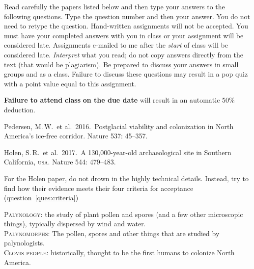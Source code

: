 \documentclass[11pt, hidelinks, addpoints]{exam}
\begin{document}
Read carefully the papers listed below and then type your answers to the following questions.
Type the question number and then your answer. You do not need to retype the question. Hand-written
assignments will not be accepted. You must have your completed answers
with you in class or your assignment will be considered late. Assignments e-mailed to me after the \emph{start} of class will be
considered late. \emph{Interpret} what you read; do not copy answers directly from the text (that would
be plagiarism). Be prepared to discuss your answers in small groups and as a class. Failure
to discuss these questions may result in a pop quiz with a point value
equal to this assignment.

\textbf{Failure to attend} \textbf{class} \textbf{on the due date} will
result in an automatic 50\% deduction.

\begin{hangparas}{1.5em}{1}
Pedersen, M.\,W.~et al.~2016.~Postglacial viability and colonization in North America's ice-free corridor. Nature 537: 45–357.

Holen, S.\,R.~et al.~2017.~A 130,000-year-old archaeological site in Southern California, \textsc{usa}. Nature 544: 479–483. 
\end{hangparas}

For the Holen paper, do not drown in the highly technical details. Instead, try to find how their evidence meets their four criteria for acceptance (question~\ref{ques:criteria})

\medskip

\textsc{Palynology:} the study of plant pollen and spores (and a few other microscopic things), typically dispersed by wind and water.\\
\textsc{Palynomorphs:} The pollen, spores and other things that are studied by palynologists.\\
\textsc{Clovis people:} historically, thought to be the first humans to colonize North America.

\medskip
\end{document}
